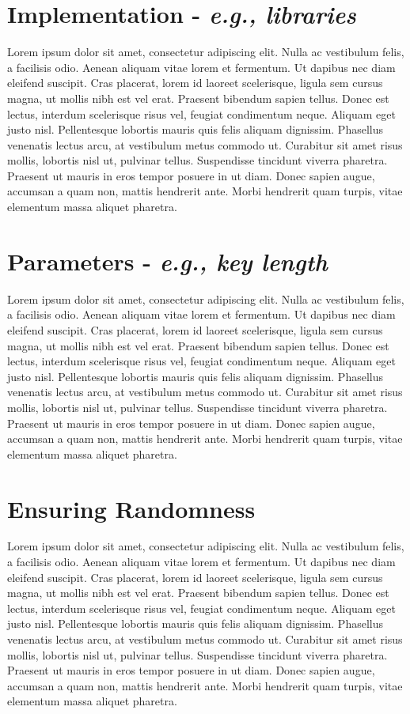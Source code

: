 \documentclass[9pt]{extarticle}
\begin{document}
\section{Implementation - \textit{e.g., libraries}}
Lorem ipsum dolor sit amet, consectetur adipiscing elit. Nulla ac vestibulum felis, a facilisis odio. Aenean aliquam vitae lorem et fermentum. Ut dapibus nec diam eleifend suscipit. Cras placerat, lorem id laoreet scelerisque, ligula sem cursus magna, ut mollis nibh est vel erat. Praesent bibendum sapien tellus. Donec est lectus, interdum scelerisque risus vel, feugiat condimentum neque. Aliquam eget justo nisl. Pellentesque lobortis mauris quis felis aliquam dignissim. Phasellus venenatis lectus arcu, at vestibulum metus commodo ut. Curabitur sit amet risus mollis, lobortis nisl ut, pulvinar tellus. Suspendisse tincidunt viverra pharetra. Praesent ut mauris in eros tempor posuere in ut diam. Donec sapien augue, accumsan a quam non, mattis hendrerit ante. Morbi hendrerit quam turpis, vitae elementum massa aliquet pharetra. 

\section{Parameters - \textit{e.g., key length}}
Lorem ipsum dolor sit amet, consectetur adipiscing elit. Nulla ac vestibulum felis, a facilisis odio. Aenean aliquam vitae lorem et fermentum. Ut dapibus nec diam eleifend suscipit. Cras placerat, lorem id laoreet scelerisque, ligula sem cursus magna, ut mollis nibh est vel erat. Praesent bibendum sapien tellus. Donec est lectus, interdum scelerisque risus vel, feugiat condimentum neque. Aliquam eget justo nisl. Pellentesque lobortis mauris quis felis aliquam dignissim. Phasellus venenatis lectus arcu, at vestibulum metus commodo ut. Curabitur sit amet risus mollis, lobortis nisl ut, pulvinar tellus. Suspendisse tincidunt viverra pharetra. Praesent ut mauris in eros tempor posuere in ut diam. Donec sapien augue, accumsan a quam non, mattis hendrerit ante. Morbi hendrerit quam turpis, vitae elementum massa aliquet pharetra. 

\section{Ensuring Randomness}
Lorem ipsum dolor sit amet, consectetur adipiscing elit. Nulla ac vestibulum felis, a facilisis odio. Aenean aliquam vitae lorem et fermentum. Ut dapibus nec diam eleifend suscipit. Cras placerat, lorem id laoreet scelerisque, ligula sem cursus magna, ut mollis nibh est vel erat. Praesent bibendum sapien tellus. Donec est lectus, interdum scelerisque risus vel, feugiat condimentum neque. Aliquam eget justo nisl. Pellentesque lobortis mauris quis felis aliquam dignissim. Phasellus venenatis lectus arcu, at vestibulum metus commodo ut. Curabitur sit amet risus mollis, lobortis nisl ut, pulvinar tellus. Suspendisse tincidunt viverra pharetra. Praesent ut mauris in eros tempor posuere in ut diam. Donec sapien augue, accumsan a quam non, mattis hendrerit ante. Morbi hendrerit quam turpis, vitae elementum massa aliquet pharetra.
\end{document}
